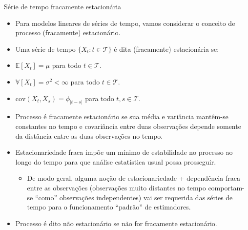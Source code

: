 \documentclass[11pt]{beamer}
\newenvironment{halfwideenumerate}{\enumerate\addtolength{\itemsep}{0.5em}}{\endenumerate}
\begin{document}
		\begin{frame}{Série de tempo fracamente estacionária}
			
			\begin{itemize}
				\item Para modelos lineares de séries de tempo, vamos considerar o conceito de {\color{blue}processo (fracamente) estacionário}.
				\item Uma série de tempo $\{X_t: t \in \mathcal{T}\}$ é dita {\color{blue}(fracamente) estacionária} se:
				\begin{halfwideenumerate}
					\item $\mathbb{E}[X_{t}] = \mu$ para todo $t \in \mathcal{T}$.
					\item $\mathbb{V}[X_{t}] = \sigma^2 < \infty$ para todo $t \in \mathcal{T}$.
					\item $\text{cov}(X_t, X_s) = \phi_{|t-s|}$ para todo $t,s \in \mathcal{T}$.
				\end{halfwideenumerate}
				\item Processo é fracamente estacionário se sua média e variância mantêm-se constantes no tempo e covariância entre duas observações depende somente da distância entre as duas observações no tempo.
				\item Estacionariedade fraca impõe um {\color{blue}mínimo} de estabilidade no processo ao longo do tempo para que análise estatística usual possa prosseguir.
				\begin{itemize}  
					\vspace{-1em}
					\item De modo geral, alguma noção de estacionariedade + dependência fraca entre as observações (observações muito distantes no tempo comportam-se ``como'' observações independentes) vai ser requerida das séries de tempo para o funcionamento ``padrão'' de estimadores.
				\end{itemize}
				\item Processo é dito {\color{blue}não estacionário} se não for fracamente estacionário.
			\end{itemize}

	\end{frame}
	
\end{document}
